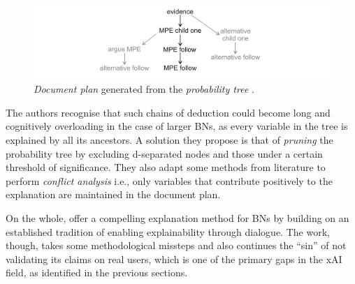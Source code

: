 \begin{figure}[htbp]
\centerline{\includegraphics[width=\textwidth]{literature-review/images/butz-tree}}
\caption{\textit{Document plan} generated from the \textit{probability tree} \citep{Butz2018}.}
\label{fig:butz-tree}
\end{figure}

The authors recognise that such chains of deduction could become long and cognitively overloading in the case of larger BNs, as every variable in the tree is explained by all its ancestors.
A solution they propose is that of \textit{pruning} the probability tree by excluding d-separated nodes and those under a certain threshold of significance.
They also adapt some methods from literature to perform \textit{conflict analysis} i.e., only variables that contribute positively to the explanation are maintained in the document plan.

On the whole, \citet{Butz2018} offer a compelling explanation method for BNs by building on an established tradition of enabling explainability through dialogue.
The work, though, takes some methodological missteps and also continues the \enquote{sin} of not validating its claims on real users, which is one of the primary gaps in the xAI field, as identified in the previous sections.